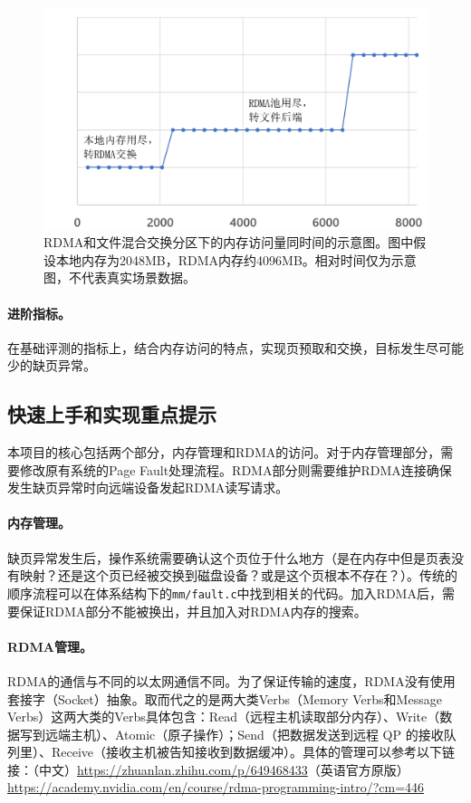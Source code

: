 \begin{figure}[h]
\centering
\includegraphics[scale=0.5]{figure/mixed-figures/RDMA-example.png}
\caption{RDMA和文件混合交换分区下的内存访问量同时间的示意图。图中假设本地内存为2048MB，RDMA内存约4096MB。相对时间仅为示意图，不代表真实场景数据。}
\label{fig:mixed:rdma-examples}
\end{figure}

\paragraph*{进阶指标。}
在基础评测的指标上，结合内存访问的特点，实现页预取和交换，目标发生尽可能少的缺页异常。

\subsection{快速上手和实现重点提示}
本项目的核心包括两个部分，内存管理和RDMA的访问。对于内存管理部分，需要修改原有系统的Page Fault处理流程。RDMA部分则需要维护RDMA连接确保发生缺页异常时向远端设备发起RDMA读写请求。

\paragraph*{内存管理。} 缺页异常发生后，操作系统需要确认这个页位于什么地方（是在内存中但是页表没有映射？还是这个页已经被交换到磁盘设备？或是这个页根本不存在？）。传统的顺序流程可以在体系结构下的\texttt{mm/fault.c}中找到相关的代码。加入RDMA后，需要保证RDMA部分不能被换出，并且加入对RDMA内存的搜索。

\paragraph*{RDMA管理。} RDMA的通信与不同的以太网通信不同。为了保证传输的速度，RDMA没有使用套接字（Socket）抽象。取而代之的是两大类Verbs（Memory Verbs和Message Verbs）这两大类的Verbs具体包含：Read（远程主机读取部分内存）、Write（数据写到远端主机）、Atomic（原子操作）；Send（把数据发送到远程 QP 的接收队列里）、Receive（接收主机被告知接收到数据缓冲）。具体的管理可以参考以下链接：（中文）\url{https://zhuanlan.zhihu.com/p/649468433}（英语官方原版）\url{https://academy.nvidia.com/en/course/rdma-programming-intro/?cm=446}

